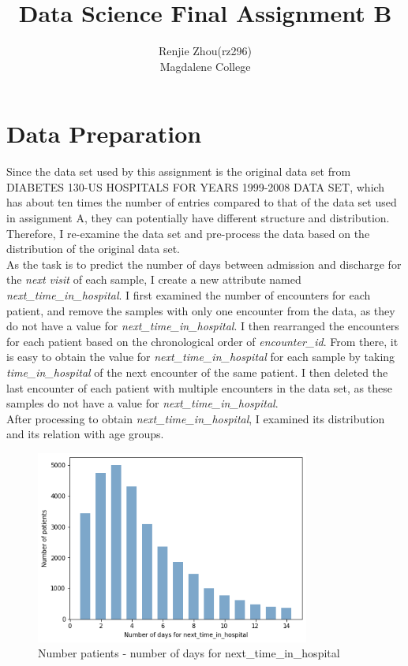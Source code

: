 \documentclass[letterpaper, 12 pt, conference]{ieeeconf}  %
\title{\LARGE \bf
Data Science Final Assignment B
}
\author{Renjie Zhou(rz296) \\%
Magdalene College
}
\begin{document}
\maketitle
\thispagestyle{empty}
\pagestyle{empty}


\section{Data Preparation}
Since the data set used by this assignment is the original data set from DIABETES 130-US HOSPITALS FOR YEARS 1999-2008 DATA SET, which has about ten times the number of entries compared to that of the data set used in assignment A, they can potentially have different structure and distribution. Therefore, I re-examine the data set and pre-process the data based on the distribution of the original data set.\\
\newline
As the task is to predict the number of days between admission and discharge for the \textit{next visit} of each sample, I create a new attribute named  \textit{next\_time\_in\_hospital}. I first examined the number of encounters for each patient, and remove the samples with only one encounter from the data, as they do not have a value for  \textit{next\_time\_in\_hospital}. I then rearranged the encounters for each patient based on the chronological order of \textit{encounter\_id}. From there, it is easy to obtain the value for  \textit{next\_time\_in\_hospital} for each sample by taking  \textit{time\_in\_hospital} of the next encounter of the same patient. I then deleted the last encounter of each patient with multiple encounters in the data set, as these samples do not have a value for \textit{next\_time\_in\_hospital}. \\\newline
After processing to obtain \textit{next\_time\_in\_hospital}, I examined its distribution and its relation with age groups.\\
\begin{figure}[h]
  \includegraphics[width=9cm]{./figs/next_t.png}
  \caption{Number patients - number of days for next\_time\_in\_hospital}
  \label{fig:boat1}
\end{figure}
\end{document}
